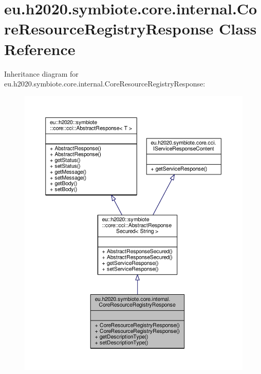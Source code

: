 \hypertarget{classeu_1_1h2020_1_1symbiote_1_1core_1_1internal_1_1CoreResourceRegistryResponse}{}\section{eu.\+h2020.\+symbiote.\+core.\+internal.\+Core\+Resource\+Registry\+Response Class Reference}
\label{classeu_1_1h2020_1_1symbiote_1_1core_1_1internal_1_1CoreResourceRegistryResponse}


Inheritance diagram for eu.\+h2020.\+symbiote.\+core.\+internal.\+Core\+Resource\+Registry\+Response\+:
\nopagebreak
\begin{figure}[H]
\begin{center}
\leavevmode
\includegraphics[width=350pt]{classeu_1_1h2020_1_1symbiote_1_1core_1_1internal_1_1CoreResourceRegistryResponse__inherit__graph}
\end{center}
\end{figure}


